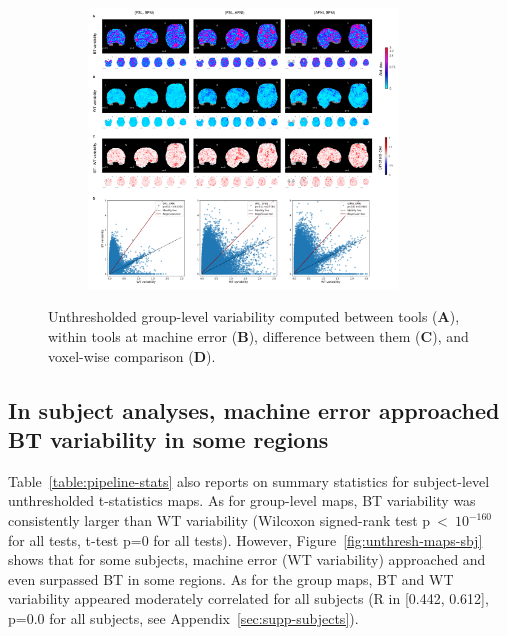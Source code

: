 \documentclass[11pt,onecolumn]{article}
\begin{document}
\begin{figure}[ht]
  \centering
      \begin{subfigure}[ht]{0.9\textwidth}
      \centering
      \includegraphics[width=0.9\textwidth]{figures/std/gl-unthresh.png}
      \end{subfigure}
    \caption{Unthresholded group-level variability computed between tools
    (\textbf{A}), within tools at machine error (\textbf{B}), difference
    between them (\textbf{C}), and voxel-wise comparison (\textbf{D}). }
    \label{fig:unthresh-maps}
  \end{figure}

  \subsection{In subject analyses, machine error approached BT variability in some regions}

  Table~\ref{table:pipeline-stats} also reports on summary statistics for
  subject-level unthresholded t-statistics maps. As for group-level maps,
  BT variability was consistently larger than WT variability (Wilcoxon
  signed-rank test p~\textless~$10^{-160}$ for all tests, t-test p=0 for
  all tests). However, Figure~\ref{fig:unthresh-maps-sbj} shows that for
  some subjects, machine error (WT variability) approached and even
  surpassed BT in some regions. As for the group maps, BT and WT
  variability appeared moderately correlated for all subjects (R in [0.442,
  0.612], p=0.0 for all subjects, see Appendix~\ref{sec:supp-subjects}).
\end{document}
